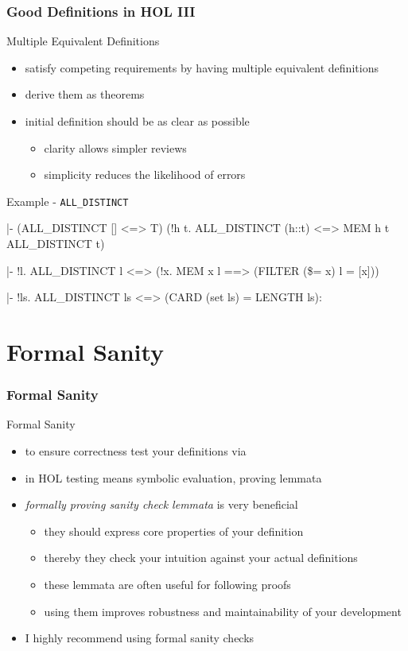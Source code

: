 \begin{frame}[fragile]
\frametitle{Good Definitions in HOL III}

\begin{block}{Multiple Equivalent Definitions}
\begin{itemize}
\item satisfy competing requirements by having multiple equivalent definitions
\item derive them as theorems
\item initial definition should be as clear as possible
\begin{itemize}
\item clarity allows simpler reviews
\item simplicity reduces the likelihood of errors
\end{itemize}
\end{itemize}
\end{block}

\begin{block}{Example - \texttt{ALL\_DISTINCT}}
\begin{semiverbatim}\scriptsize
|- (ALL_DISTINCT [] <=> T) \holAnd{}
   (!h t. ALL_DISTINCT (h::t) <=> \holNeg{}MEM h t \holAnd{} ALL_DISTINCT t)

|- !l. ALL_DISTINCT l <=> 
       (!x. MEM x l ==> (FILTER (\$= x) l = [x]))

|- !ls. ALL_DISTINCT ls <=> (CARD (set ls) = LENGTH ls):
\end{semiverbatim}
\end{block}
\end{frame}


\section{Formal Sanity}

\begin{frame}[fragile]
\frametitle{Formal Sanity}

\begin{block}{Formal Sanity}
\begin{itemize}
\item to ensure correctness test your definitions via \eg {}
\item in HOL testing means symbolic evaluation, \ie proving lemmata
\item \emph{formally proving sanity check lemmata} is very beneficial
\begin{itemize} 
\item they should express core properties of your definition
\item thereby they check your intuition against your actual definitions
\item these lemmata are often useful for following proofs
\item using them improves robustness and maintainability of your development
\end{itemize}
\item I highly recommend using formal sanity checks
\end{itemize}
\end{block}
\end{frame}

